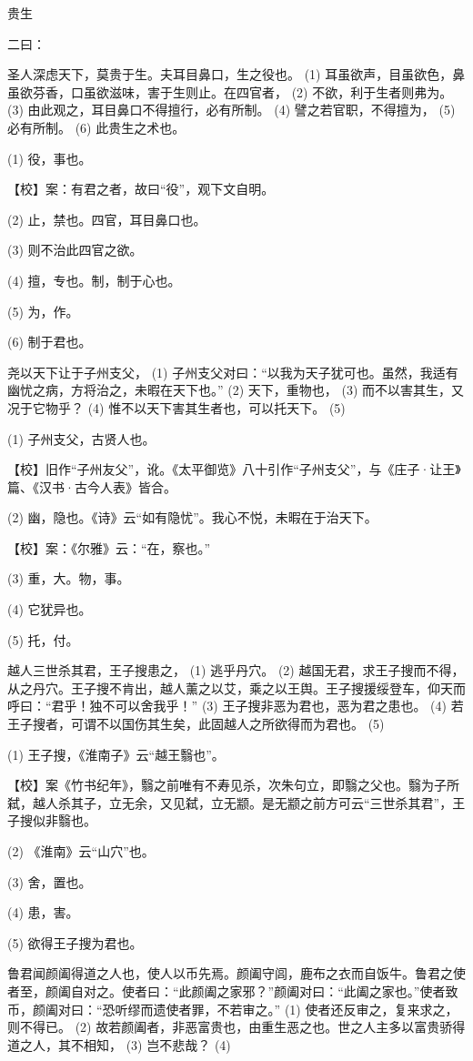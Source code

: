 \documentclass[12pt,UTF8]{ctexbook}
\begin{document}
贵生


二曰：

圣人深虑天下，莫贵于生。夫耳目鼻口，生之役也。 (1) 耳虽欲声，目虽欲色，鼻虽欲芬香，口虽欲滋味，害于生则止。在四官者， (2) 不欲，利于生者则弗为。 (3) 由此观之，耳目鼻口不得擅行，必有所制。 (4) 譬之若官职，不得擅为， (5) 必有所制。 (6) 此贵生之术也。

(1) 役，事也。

【校】案：有君之者，故曰“役”，观下文自明。

(2) 止，禁也。四官，耳目鼻口也。

(3) 则不治此四官之欲。

(4) 擅，专也。制，制于心也。

(5) 为，作。

(6) 制于君也。

尧以天下让于子州支父， (1) 子州支父对曰：“以我为天子犹可也。虽然，我适有幽忧之病，方将治之，未暇在天下也。” (2) 天下，重物也， (3) 而不以害其生，又况于它物乎？ (4) 惟不以天下害其生者也，可以托天下。 (5)

(1) 子州支父，古贤人也。

【校】旧作“子州友父”，讹。《太平御览》八十引作“子州支父”，与《庄子·让王》篇、《汉书·古今人表》皆合。

(2) 幽，隐也。《诗》云“如有隐忧”。我心不悦，未暇在于治天下。

【校】案：《尔雅》云：“在，察也。”

(3) 重，大。物，事。

(4) 它犹异也。

(5) 托，付。

越人三世杀其君，王子搜患之， (1) 逃乎丹穴。 (2) 越国无君，求王子搜而不得，从之丹穴。王子搜不肯出，越人薰之以艾，乘之以王舆。王子搜援绥登车，仰天而呼曰：“君乎！独不可以舍我乎！” (3) 王子搜非恶为君也，恶为君之患也。 (4) 若王子搜者，可谓不以国伤其生矣，此固越人之所欲得而为君也。 (5)

(1) 王子搜，《淮南子》云“越王翳也”。

【校】案《竹书纪年》，翳之前唯有不寿见杀，次朱句立，即翳之父也。翳为子所弑，越人杀其子，立无余，又见弑，立无颛。是无颛之前方可云“三世杀其君”，王子搜似非翳也。

(2) 《淮南》云“山穴”也。

(3) 舍，置也。

(4) 患，害。

(5) 欲得王子搜为君也。

鲁君闻颜阖得道之人也，使人以币先焉。颜阖守闾，鹿布之衣而自饭牛。鲁君之使者至，颜阖自对之。使者曰：“此颜阖之家邪？”颜阖对曰：“此阖之家也。”使者致币，颜阖对曰：“恐听缪而遗使者罪，不若审之。” (1) 使者还反审之，复来求之，则不得已。 (2) 故若颜阖者，非恶富贵也，由重生恶之也。世之人主多以富贵骄得道之人，其不相知， (3) 岂不悲哉？ (4)
\end{document}
